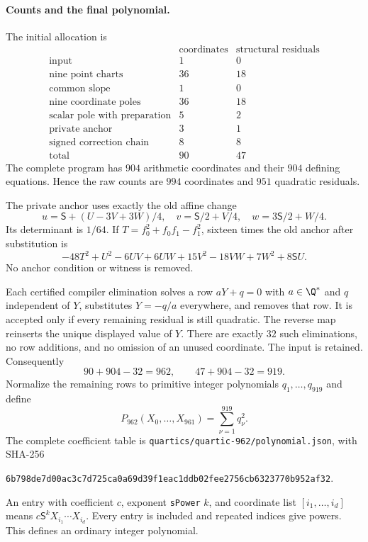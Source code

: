 \paragraph{Counts and the final polynomial.}
The initial allocation is
\[
\begin{array}{l|r|r}
 &\text{coordinates}&\text{structural residuals}\\\hline
 \text{input}&1&0\\
 \text{nine point charts}&36&18\\
 \text{common slope}&1&0\\
 \text{nine coordinate poles}&36&18\\
 \text{scalar pole with preparation}&5&2\\
 \text{private anchor}&3&1\\
 \text{signed correction chain}&8&8\\\hline
 \text{total}&90&47
\end{array}
\]
The complete program has $904$ arithmetic coordinates and their
$904$ defining equations. Hence the raw counts are $994$ coordinates
and $951$ quadratic residuals.

The private anchor uses exactly the old affine change
\[
 u=\mathsf S+(U-3V+3W)/4,\quad
 v=\mathsf S/2+V/4,\quad w=3\mathsf S/2+W/4.
\]
Its determinant is $1/64$. If $T=f_0^2+f_0f_1-f_1^2$, sixteen times
the old anchor after substitution is
\[
 -48T^2+U^2-6UV+6UW+15V^2-18VW+7W^2+8\mathsf S U.
\]
No anchor condition or witness is removed.

Each certified compiler elimination solves a row $aY+q=0$ with
$a\in\Q^*$ and $q$ independent of $Y$, substitutes $Y=-q/a$
everywhere, and removes that row. It is accepted only if every
remaining residual is still quadratic. The reverse map reinserts
the unique displayed value of $Y$. There are exactly $32$ such
eliminations, no row additions, and no omission of an unused coordinate.
The input is retained. Consequently
\[
 90+904-32=962,\qquad47+904-32=919.
\]
Normalize the remaining rows to primitive integer polynomials
$q_1,\ldots,q_{919}$ and define
\begin{equation}\label{eq:v6-final-polynomial}
 P_{962}(X_0,\ldots,X_{961})=\sum_{\nu=1}^{919}q_\nu^2.
\end{equation}
The complete coefficient table is
\nolinkurl{quartics/quartic-962/polynomial.json}, with SHA-256
\begin{center}\small
\nolinkurl{6b798de7d00ac3c7d725ca0a69d39f1eac1ddb02fee2756cb6323770b952af32}.
\end{center}
An entry with coefficient $c$, exponent \texttt{sPower} $k$, and
coordinate list $[i_1,\ldots,i_d]$ means
$c\mathsf S^kX_{i_1}\cdots X_{i_d}$. Every entry is included and repeated
indices give powers. This defines an ordinary integer polynomial.

